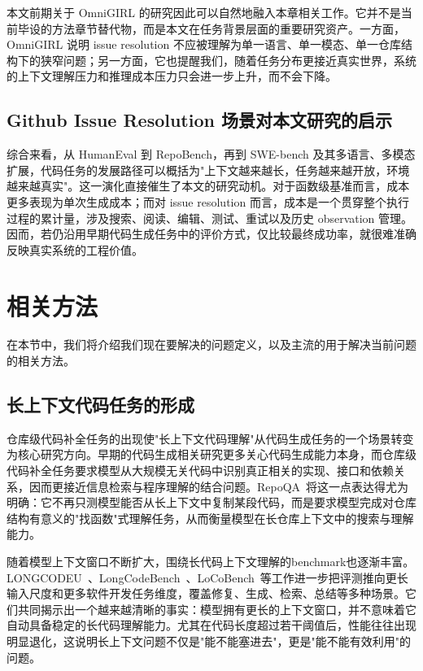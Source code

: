 本文前期关于 OmniGIRL 的研究因此可以自然地融入本章相关工作。它并不是当前毕设的方法章节替代物，而是本文在任务背景层面的重要研究资产。一方面，OmniGIRL 说明 issue resolution 不应被理解为单一语言、单一模态、单一仓库结构下的狭窄问题；另一方面，它也提醒我们，随着任务分布更接近真实世界，系统的上下文理解压力和推理成本压力只会进一步上升，而不会下降。

\subsection{Github Issue Resolution 场景对本文研究的启示}

综合来看，从 HumanEval 到 RepoBench，再到 SWE-bench 及其多语言、多模态扩展，代码任务的发展路径可以概括为"上下文越来越长，任务越来越开放，环境越来越真实"。这一演化直接催生了本文的研究动机。对于函数级基准而言，成本更多表现为单次生成成本；而对 issue resolution 而言，成本是一个贯穿整个执行过程的累计量，涉及搜索、阅读、编辑、测试、重试以及历史 observation 管理。因而，若仍沿用早期代码生成任务中的评价方式，仅比较最终成功率，就很难准确反映真实系统的工程价值。


\section{相关方法}
在本节中，我们将介绍我们现在要解决的问题定义，以及主流的用于解决当前问题的相关方法。

\subsection{长上下文代码任务的形成}
仓库级代码补全任务的出现使"长上下文代码理解"从代码生成任务的一个场景转变为核心研究方向。早期的代码生成相关研究更多关心代码生成能力本身，而仓库级代码补全任务要求模型从大规模无关代码中识别真正相关的实现、接口和依赖关系，因而更接近信息检索与程序理解的结合问题。RepoQA~\cite{liu2024repoqa}将这一点表达得尤为明确：它不再只测模型能否从长上下文中复制某段代码，而是要求模型完成对仓库结构有意义的"找函数"式理解任务，从而衡量模型在长仓库上下文中的搜索与理解能力。

随着模型上下文窗口不断扩大，围绕长代码上下文理解的benchmark也逐渐丰富。LONGCODEU~\cite{li2025longcodeu}、LongCodeBench~\cite{rando2025longcodebench}、LoCoBench~\cite{qiu2025locobench}等工作进一步把评测推向更长输入尺度和更多软件开发任务维度，覆盖修复、生成、检索、总结等多种场景。它们共同揭示出一个越来越清晰的事实：模型拥有更长的上下文窗口，并不意味着它自动具备稳定的长代码理解能力。尤其在代码长度超过若干阈值后，性能往往出现明显退化，这说明长上下文问题不仅是"能不能塞进去"，更是"能不能有效利用"的问题。

